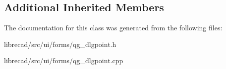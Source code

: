 \subsection*{Additional Inherited Members}


The documentation for this class was generated from the following files\-:\begin{DoxyCompactItemize}
\item 
librecad/src/ui/forms/qg\-\_\-dlgpoint.\-h\item 
librecad/src/ui/forms/qg\-\_\-dlgpoint.\-cpp\end{DoxyCompactItemize}
